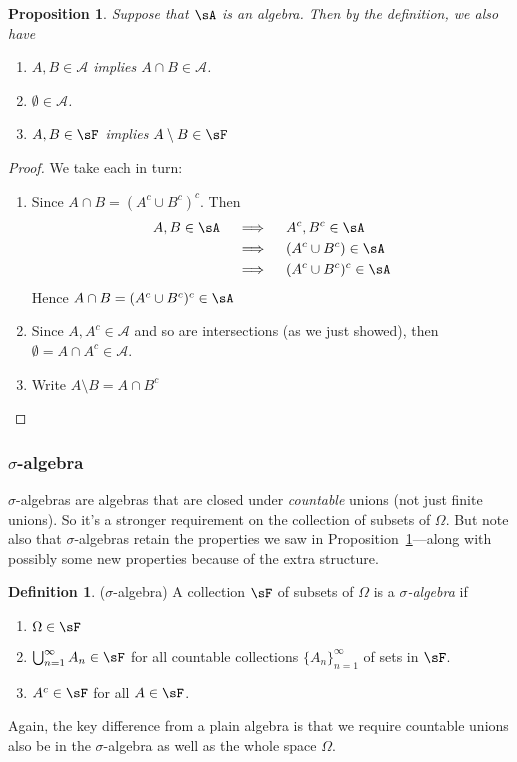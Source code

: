 \documentclass[12pt]{article}
\theoremstyle{plain}
\newtheorem{prop}[thm]{Proposition}
\theoremstyle{definition}
\newtheorem{defn}[thm]{Definition}
\theoremstyle{remark}
\begin{document}
\begin{prop}
\label{prop:algebra}
Suppose that $\sA$ is an algebra. Then by the definition, we also have
\begin{enumerate}
  \item $A,B\in\mathscr{A}$ implies $A\cap B\in \mathscr{A}$.
  \item $\emptyset \in \mathscr{A}$.
  \item $A,B\in \sF$ implies $A\setminus B \in \sF$
\end{enumerate}
\end{prop}
\begin{proof}
We take each in turn:
\begin{enumerate}
  \item Since $A\cap B = (A^c \cup B^c)^c$. Then
    \begin{align*}
      A,B\in\sA
      &\quad\implies\quad
      A^c,B^c\in\sA \\
      &\quad\implies\quad
      (A^c\cup B^c)\in\sA \\
      &\quad\implies\quad
      (A^c\cup B^c)^c\in\sA
    \end{align*}
    Hence $A\cap B = (A^c \cup B^c)^c \in \sA$

  \item Since $A, A^c \in \mathscr{A}$ and so are intersections (as we
    just showed), then $\emptyset = A\cap A^c \in \mathscr{A}$.

  \item Write $A\setminus B = A \cap B^c$
\end{enumerate}
\end{proof}


\subsubsection{$\sigma$-algebra}

$\sigma$-algebras are algebras that are closed under \emph{countable}
unions (not just finite unions). So it's a stronger requirement on the
collection of subsets of $\Omega$. But note also that $\sigma$-algebras
retain the properties we saw in Proposition~\ref{prop:algebra}---along
with possibly some new properties because of the extra structure.

\begin{defn}($\sigma$-algebra)
A collection $\sF$ of subsets of $\Omega$ is a \emph{$\sigma$-algebra}
if
\begin{enumerate}
  \item $\Omega\in\sF$
  \item $\bigcup_{n=1}^\infty A_n \in \sF$ for all countable
    collections $\{A_n\}_{n=1}^\infty$ of sets in $\sF$.
  \item $A^c \in \sF$ for all $A\in\sF$.
\end{enumerate}
Again, the key difference from a plain algebra is that we require
countable unions also be in the $\sigma$-algebra as well as the whole
space $\Omega$.
\end{defn}
\end{document}

